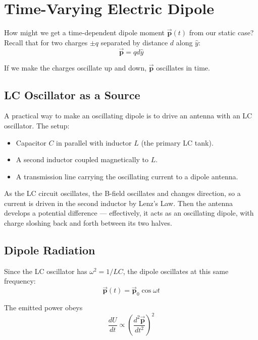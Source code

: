 \documentclass[11pt]{report}
\newcommand{\vbf}[1]{\vec{\mathbf{#1}}}
\begin{document}
\section{Time-Varying Electric Dipole}

How might we get a time-dependent dipole moment $\vbf{p}(t)$ from our static case? Recall that for two charges $\pm q$ separated by distance $d$ along $\hat{y}$:
\begin{equation}
\vbf{p} = q d \hat{y}
\end{equation}

If we make the charges oscillate up and down, $\vbf{p}$ oscillates in time.

\subsection{LC Oscillator as a Source}

A practical way to make an oscillating dipole is to drive an antenna with an LC oscillator. The setup:
\begin{itemize}
    \item Capacitor $C$ in parallel with inductor $L$ (the primary LC tank).
    \item A second inductor coupled magnetically to $L$.
    \item A transmission line carrying the oscillating current to a dipole antenna.
\end{itemize}

As the LC circuit oscillates, the B-field oscillates and changes direction, so a current is driven in the second inductor by Lenz's Law. Then the antenna develops a potential difference --- effectively, it acts as an oscillating dipole, with charge sloshing back and forth between its two halves.

\subsection{Dipole Radiation}

Since the LC oscillator has $\omega^2 = 1/LC$, the dipole oscillates at this same frequency:
\begin{equation}
\vbf{p}(t) = \vbf{p}_0 \cos\omega t
\end{equation}

The emitted power obeys
\begin{equation}
\frac{dU}{dt} \propto \left(\frac{d^2 \vbf{p}}{dt^2}\right)^2
\end{equation}
\end{document}
